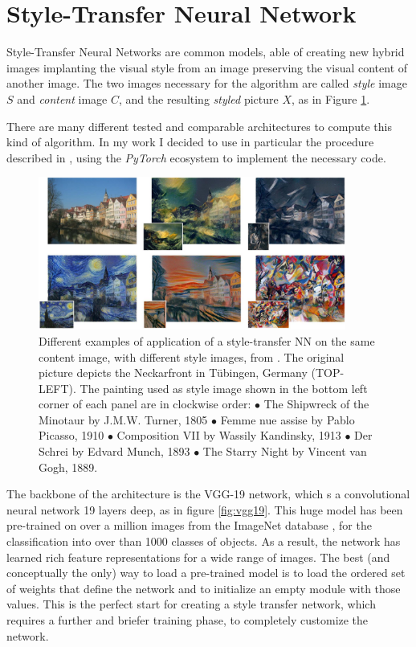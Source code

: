 
\section{Style-Transfer Neural Network}    \label{ssec:sttrNN}
    Style-Transfer Neural Networks are common models, able of creating new hybrid images implanting the visual style from an image preserving the visual content of another image. The two images necessary for the algorithm are called \textit{style} image $S$ and \textit{content} image $C$, and the resulting \textit{styled} picture $X$, as in Figure \ref{fig:ex_st_tr}.

    There are many different tested and comparable architectures to compute this kind of algorithm. In my work I decided to use in particular the procedure described in \cite{1508.06576}, using the \textit{PyTorch} ecosystem to implement the necessary code.

    \begin{figure}
        \centering
        \includegraphics[width = 0.9\textwidth]{images/st_trasf_ex}
        \caption{Different examples of application of a style-transfer NN on the same content image, with different style images, from \cite{1508.06576}. The
    original picture depicts the Neckarfront in Tübingen, Germany (TOP-LEFT). The painting used as style image shown in the bottom left corner of each panel are in clockwise order: $\bullet$ The Shipwreck of the Minotaur by J.M.W. Turner, 1805 $\bullet$ Femme nue assise by Pablo Picasso, 1910 $\bullet$ Composition VII by Wassily Kandinsky, 1913 $\bullet$ Der Schrei by Edvard Munch, 1893 $\bullet$ The Starry Night by Vincent van Gogh, 1889.}
        \label{fig:ex_st_tr}
    \end{figure}

    The backbone of the architecture is the VGG-19 network, which s a convolutional neural network 19 layers deep, as in figure \ref{fig:vgg19}. This huge model has been pre-trained on over a million images from the ImageNet database \cite{imagenet_cvpr09}, for the classification into over than 1000 classes of objects. As a result, the network has learned rich feature representations for a wide range of images. The best (and conceptually the only) way to load a pre-trained model is to load the ordered set of weights that define the network and to initialize an empty module with those values. This is the perfect start for creating a style transfer network, which requires a further and briefer training phase, to completely customize the network.

